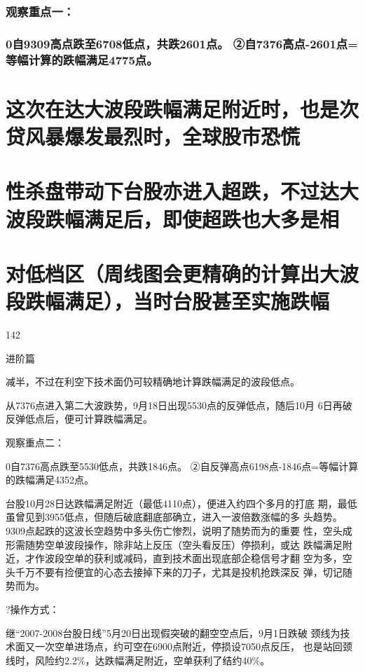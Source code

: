 \documentclass{article}
\begin{document}
\subsubsection{观察重点一：}

\subsubsection{0自9309高点跌至6708低点，共跌2601点。 ②自7376高点-2601点=等幅计算的跌幅满足4775点。}

\section{这次在达大波段跌幅满足附近时，也是次贷风暴爆发最烈时，全球股市恐慌}

\section{性杀盘带动下台股亦进入超跌，不过达大波段跌幅满足后，即使超跌也大多是相}

\section{对低档区（周线图会更精确的计算出大波段跌幅满足），当时台股甚至实施跌幅}

142

\clearpage

进阶篇

减半，不过在利空下技术面仍可较精确地计算跌幅满足的波段低点。

从7376点进入第二大波跌势，9月18日出现5530点的反弹低点，随后10月 6日再破反弹低点后，便可计算跌幅满足。

观察重点二：

0自7376高点跌至5530低点，共跌1846点。 ②自反弹高点6198点-1846点=等幅计算的跌幅满足4352点。

台股10月28日达跌幅满足附近（最低4110点），便进入约四个多月的打底 期，最低虽曾见到3955低点，但随后破底翻底部确立，进入一波倍数涨幅的多 头趋势。9309点起跌的这波长空趋势中多头伤亡惨烈，说明了随势而为的重要 性，空头成形需随势空单波段操作，除非站上反压（空头看反压）停损利，或达 跌幅满足附近，才作波段空单的获利或减码，直到技术面出现底部企稳信号才翻 空为多，空头千万不要有捡便宜的心态去接掉下来的刀子，尤其是投机抢跌深反 弹，切记随势而为。

?操作方式：

继“2007-2008台股日线”5月20日出现假突破的翻空空点后，9月1日跌破 颈线为技术面又一次空单进场点，约可空在6900点附近，停损设7050点反压， 也是站回颈线时，风险约2.2\%，达跌幅满足附近，空单获利了结约40\%。
\end{document}
